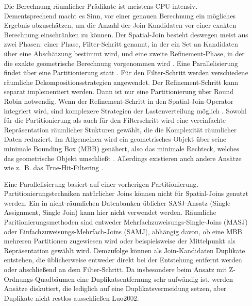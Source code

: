 \documentclass[a4paper,12pt,twoside]{article}
\begin{document}
Die Berechnung räumlicher Prädikate ist meistens CPU-intensiv. Dementsprechend macht es Sinn, vor einer genauen Berechnung ein mögliches Ergebnis abzuschätzen, um die Anzahl der Join-Kandidaten vor einer exakten Berechnung einschränken zu können. Der Spatial-Join besteht deswegen meist aus zwei Phasen: einer 
Phase, Filter-Schritt genannt, in der ein Set an Kandidaten über eine Abschätzung bestimmt wird, und eine zweite Refinement-Phase, in der die exakte geometrische Berechnung vorgenommen wird {\autocite[S. 309f]{Rigaux2001}}. Eine Parallelisierung findet über eine Partitionierung statt {\autocite{Zhou1998}}. Für den Filter-Schritt 
werden verschiedene räumliche Dekompositionsstrategien angewendet. Der Refinement-Schritt kann separat implementiert werden. Dann ist nur eine Partitionierung über Round Robin notwendig. Wenn der Refinement-Schritt in den Spatial-Join-Operator integriert wird, sind komplexere Strategien der Lastenverteilung möglich {\autocite{Brinkhoff1996}}. Sowohl für die Partitionierung als auch für den Filterschritt wird eine vereinfachte Repräsentation räumlicher Stukturen gewählt, die die Komplexität räumlicher Daten reduziert. Im Allgemeinen wird ein geometrisches Objekt über seine minimale Bounding Box (MBB) genähert, also das minimale Rechteck, welches das geometrische Objekt umschließt {\autocite[S. 202f]{Rigaux2001}}. Allerdings existieren auch andere Ansätze wie z.~B. das True-Hit-Filtering {\autocite{Bouros2019}}.

Eine Parallelisierung basiert auf einer vorherigen Partitionierung. Partitionierungstechniken natürlicher Joins können nicht für Spatial-Joins genutzt werden. Ein in nicht-räumlichen Datenbanken üblicher SASJ-Ansatz (Single Assignment, Single Join) kann hier nicht verwendet werden. Räumliche Paritionierungsmethoden sind entweder Mehrfachzuweisungs-Single-Joins (MASJ) oder Einfachzuweisungs-Mehrfach-Joins (SAMJ), abhängig davon, ob eine MBB mehreren Partitionen zugewiesen wird oder beispielsweise der Mittelpunkt als Repräsentation gewählt wird. Demzufolge können als Join-Kandidaten Duplikate entstehen, die üblicherweise entweder direkt bei der Entstehung entfernt werden oder abschließend an dem Filter-Schritt. Da insbesondere beim Ansatz mit Z-Ordnungs-Quadbäumen eine Duplikatsentfernung sehr aufwändig ist, werden Ansätze diskutiert, die lediglich auf eine Duplikatsvermeidung setzen, aber Duplikate nicht restlos ausschließen {\autocite{Jacox2007}{Luo2002}}. 
\end{document}
